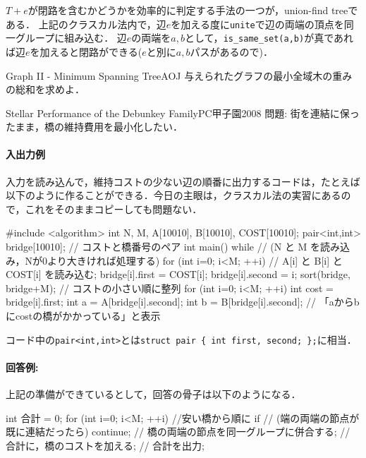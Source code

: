 $T+e$が閉路を含むかどうかを効率的に判定する手法の一つが，union-find treeである．
上記のクラスカル法内で，辺$e$を加える度に\texttt{unite}で辺の両端の頂点を同一グループに組み込む．
辺$e$の両端を$a,b$として，\texttt{is\_same\_set(a,b)}が真であれば辺$e$を加えると閉路ができる($e$と別に$a,b$パスがあるので)．

\begin{psbox}{Graph II - Minimum Spanning Tree}{AOJ}
与えられたグラフの最小全域木の重みの総和を求めよ．

\end{psbox}

\begin{pbox}{Stellar Performance of the Debunkey Family}{PC甲子園2008}
問題: 街を連結に保ったまま，橋の維持費用を最小化したい．

\end{pbox}

\paragraph{入出力例}
入力を読み込んで，維持コストの少ない辺の順番に出力するコードは，たとえば以下のように作ることができる．今日の主眼は，クラスカル法の実習にあるので，これをそのままコピーしても問題ない．

\begin{cbox}
#include <algorithm>
int N, M, A[10010], B[10010], COST[10010];
pair<int,int> bridge[10010]; // コストと橋番号のペア
int main() {
    while // (N と M を読み込み，Nが0より大きければ処理する) {
        for (int i=0; i<M; ++i) {
            // A[i] と B[i] と COST[i] を読み込む;
            bridge[i].first = COST[i];
            bridge[i].second = i;
        }
        sort(bridge, bridge+M); // コストの小さい順に整列
        for (int i=0; i<M; ++i) {
            int cost = bridge[i].first;
            int a = A[bridge[i].second];
            int b = B[bridge[i].second];
            // 「aからbにcostの橋がかかっている」と表示
        }
    }
}
\end{cbox}

コード中の\texttt{pair<int,int>}とは\texttt{struct pair \{ int first, second; \};}に相当．

\paragraph{回答例:} 上記の準備ができているとして，回答の骨子は以下のようになる．

\begin{cbox}
        int 合計 = 0;
        for (int i=0; i<M; ++i) { //安い橋から順に
            if // (端の両端の節点が既に連結だったら)
                continue;
            // 橋の両端の節点を同一グループに併合する;
            // 合計に，橋のコストを加える;
        }
        // 合計を出力;
\end{cbox}

